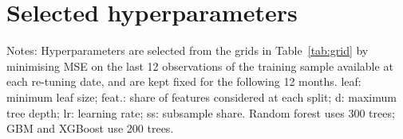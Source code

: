 \section{Selected hyperparameters}\label{app:params}
\begin{table}[!ht]\centering\scriptsize\caption{Hyperparameters selected at each re-tuning date}\label{tab:params}
\begin{minipage}{0.95\linewidth}\footnotesize\vspace{2pt} Notes: Hyperparameters are selected from the grids in Table~\ref{tab:grid} by minimising MSE on the last 12 observations of the training sample available at each re-tuning date, and are kept fixed for the following 12 months. leaf: minimum leaf size; feat.: share of features considered at each split; d: maximum tree depth; lr: learning rate; ss: subsample share. Random forest uses 300 trees; GBM and XGBoost use 200 trees.\end{minipage}
\end{table}
